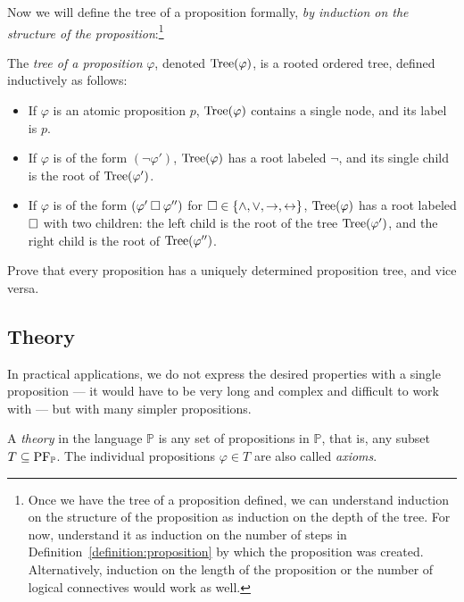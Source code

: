 Now we will define the tree of a proposition formally, \emph{by induction on the structure of the proposition}:\footnote{Once we have the tree of a proposition defined, we can understand induction on the structure of the proposition as induction on the depth of the tree. For now, understand it as induction on the number of steps in Definition~\ref{definition:proposition} by which the proposition was created. Alternatively, induction on the length of the proposition or the number of logical connectives would work as well.}

\begin{definition}
    The \emph{tree of a proposition} $\varphi$, denoted $\operatorname{Tree}(\varphi)$, is a rooted ordered tree, defined inductively as follows: 
    \begin{itemize}
        \item If $\varphi$ is an atomic proposition $p$, $\operatorname{Tree}(\varphi)$ contains a single node, and its label is $p$.
        \item If $\varphi$ is of the form $(\neg \varphi')$, $\operatorname{Tree}(\varphi)$ has a root labeled $\neg$, and its single child is the root of $\operatorname{Tree}(\varphi')$.
        \item If $\varphi$ is of the form $(\varphi' \mathbin{\square} \varphi'')$ for ${\mathbin{\square}} \in \{\land, \lor, \mathbin{\rightarrow}, \mathbin{\leftrightarrow}\}$, $\operatorname{Tree}(\varphi)$ has a root labeled ${\mathbin{\square}}$ with two children: the left child is the root of the tree $\operatorname{Tree}(\varphi')$, and the right child is the root of $\operatorname{Tree}(\varphi'')$.
    \end{itemize}
\end{definition}

\begin{exercise}
    Prove that every proposition has a uniquely determined proposition tree, and vice versa.
\end{exercise}

\subsection{Theory}

In practical applications, we do not express the desired properties with a single proposition — it would have to be very long and complex and difficult to work with — but with many simpler propositions.

\begin{definition}[Theory]\label{definition:theory}
    A \emph{theory} in the language $\mathbb{P}$ is any set of propositions in $\mathbb{P}$, that is, any subset $T \subseteq \operatorname{PF}_\mathbb{P}$. The individual propositions $\varphi \in T$ are also called \emph{axioms}.
\end{definition}

